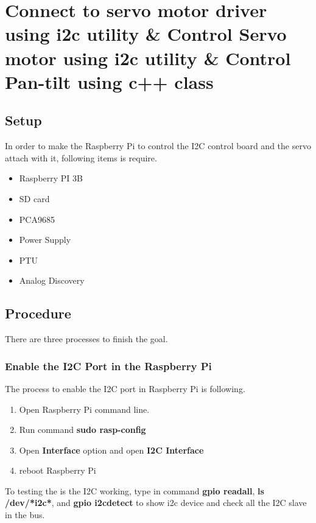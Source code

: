 \documentclass{article}
\begin{document}
\section{Connect to servo motor driver using i2c utility \& Control Servo motor using i2c utility \& Control Pan-tilt using c++ class}
\subsection{Setup}
In order to make the Raspberry Pi to control the I2C control board and the servo attach with it, following items is require.
\begin{itemize}
	\item Raspberry PI 3B
	\item SD card
	\item PCA9685
	\item Power Supply
	\item PTU
	\item Analog Discovery
\end{itemize}
\subsection{Procedure}
There are three processes to finish the goal.
\subsubsection{Enable the I2C Port in the Raspberry Pi}
The process to enable the I2C port in Raspberry Pi is following.
\begin{enumerate}[1)]
	\item Open Raspberry Pi command line.
	\item Run command \textbf{sudo rasp-config}
	\item Open \textbf{Interface} option and open \textbf{I2C Interface}
	\item reboot Raspberry Pi
\end{enumerate}
To testing the is the I2C working, type in command \textbf{gpio readall}, \textbf{ls /dev/*i2c*}, and \textbf{gpio i2cdetect} to show i2c device and check all the I2C slave in the bus.
\end{document}
